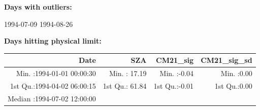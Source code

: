 \documentclass[
  10pt,
  a4paper,oneside]{article}
\begin{document}
\normalsize

\textbf{Days with outliers:}

1994-07-09 1994-08-26

\textbf{Days hitting physical limit:}

\footnotesize

\begin{longtable}[]{@{}rrrr@{}}
\toprule
\begin{minipage}[b]{0.34\columnwidth}\raggedleft
Date\strut
\end{minipage} & \begin{minipage}[b]{0.19\columnwidth}\raggedleft
SZA\strut
\end{minipage} & \begin{minipage}[b]{0.18\columnwidth}\raggedleft
CM21\_sig\strut
\end{minipage} & \begin{minipage}[b]{0.18\columnwidth}\raggedleft
CM21\_sig\_sd\strut
\end{minipage}\tabularnewline
\midrule
\endhead
\begin{minipage}[t]{0.34\columnwidth}\raggedleft
Min. :1994-01-01 00:00:30\strut
\end{minipage} & \begin{minipage}[t]{0.19\columnwidth}\raggedleft
Min. : 17.19\strut
\end{minipage} & \begin{minipage}[t]{0.18\columnwidth}\raggedleft
Min. :-0.04\strut
\end{minipage} & \begin{minipage}[t]{0.18\columnwidth}\raggedleft
Min. :0.00\strut
\end{minipage}\tabularnewline
\begin{minipage}[t]{0.34\columnwidth}\raggedleft
1st Qu.:1994-04-02 06:00:15\strut
\end{minipage} & \begin{minipage}[t]{0.19\columnwidth}\raggedleft
1st Qu.: 61.84\strut
\end{minipage} & \begin{minipage}[t]{0.18\columnwidth}\raggedleft
1st Qu.:-0.01\strut
\end{minipage} & \begin{minipage}[t]{0.18\columnwidth}\raggedleft
1st Qu.:0.00\strut
\end{minipage}\tabularnewline
\begin{minipage}[t]{0.34\columnwidth}\raggedleft
Median :1994-07-02 12:00:00\strut
\end{minipage} & \begin{minipage}[t]{0.19\columnwidth}\raggedleft

\end{minipage}
\end{longtable}
\end{document}
